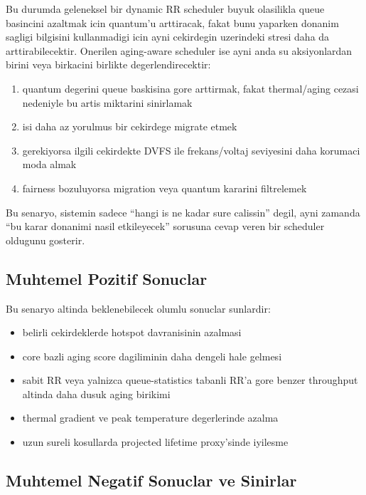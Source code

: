 \documentclass[12pt,a4paper]{article}
\begin{document}
Bu durumda geleneksel bir dynamic RR scheduler buyuk olasilikla queue basincini azaltmak icin quantum'u arttiracak,
fakat bunu yaparken donanim sagligi bilgisini kullanmadigi icin ayni cekirdegin uzerindeki stresi daha da arttirabilecektir.
Onerilen aging-aware scheduler ise ayni anda su aksiyonlardan birini veya birkacini birlikte degerlendirecektir:

\begin{enumerate}[leftmargin=*]
\item quantum degerini queue baskisina gore arttirmak, fakat thermal/aging cezasi nedeniyle bu artis miktarini sinirlamak
\item isi daha az yorulmus bir cekirdege migrate etmek
\item gerekiyorsa ilgili cekirdekte DVFS ile frekans/voltaj seviyesini daha korumaci moda almak
\item fairness bozuluyorsa migration veya quantum kararini filtrelemek
\end{enumerate}

Bu senaryo, sistemin sadece ``hangi is ne kadar sure calissin'' degil, ayni zamanda ``bu karar donanimi nasil etkileyecek''
sorusuna cevap veren bir scheduler oldugunu gosterir.

\subsection{Muhtemel Pozitif Sonuclar}

Bu senaryo altinda beklenebilecek olumlu sonuclar sunlardir:

\begin{itemize}[leftmargin=*]
\item belirli cekirdeklerde hotspot davranisinin azalmasi
\item core bazli aging score dagiliminin daha dengeli hale gelmesi
\item sabit RR veya yalnizca queue-statistics tabanli RR'a gore benzer throughput altinda daha dusuk aging birikimi
\item thermal gradient ve peak temperature degerlerinde azalma
\item uzun sureli kosullarda projected lifetime proxy'sinde iyilesme
\end{itemize}

\subsection{Muhtemel Negatif Sonuclar ve Sinirlar}
\end{document}
